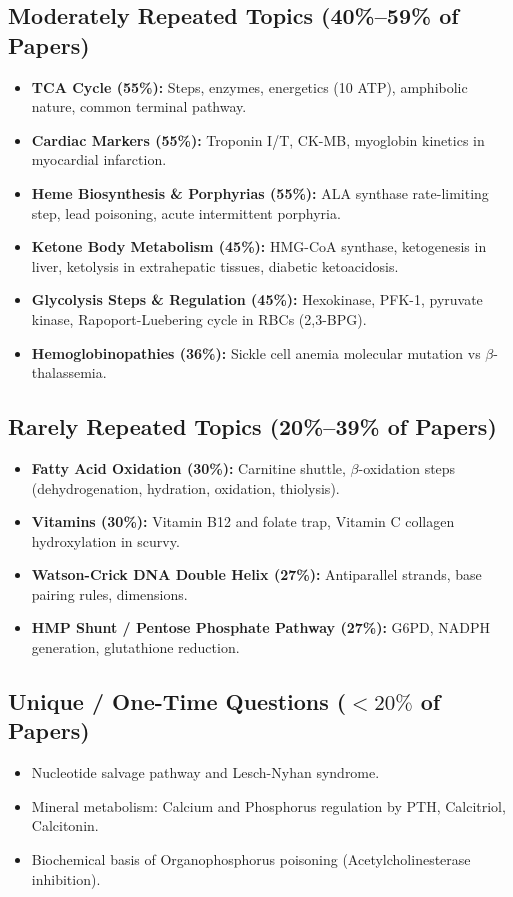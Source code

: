 \documentclass[11pt,a4paper]{article}
\begin{document}
\subsection{Moderately Repeated Topics (40\%--59\% of Papers)}
\begin{itemize}[leftmargin=*]
    \item \textbf{TCA Cycle (55\%):} Steps, enzymes, energetics (10 ATP), amphibolic nature, common terminal pathway.
    \item \textbf{Cardiac Markers (55\%):} Troponin I/T, CK-MB, myoglobin kinetics in myocardial infarction.
    \item \textbf{Heme Biosynthesis \& Porphyrias (55\%):} ALA synthase rate-limiting step, lead poisoning, acute intermittent porphyria.
    \item \textbf{Ketone Body Metabolism (45\%):} HMG-CoA synthase, ketogenesis in liver, ketolysis in extrahepatic tissues, diabetic ketoacidosis.
    \item \textbf{Glycolysis Steps \& Regulation (45\%):} Hexokinase, PFK-1, pyruvate kinase, Rapoport-Luebering cycle in RBCs (2,3-BPG).
    \item \textbf{Hemoglobinopathies (36\%):} Sickle cell anemia molecular mutation vs $\beta$-thalassemia.
\end{itemize}

\subsection{Rarely Repeated Topics (20\%--39\% of Papers)}
\begin{itemize}[leftmargin=*]
    \item \textbf{Fatty Acid Oxidation (30\%):} Carnitine shuttle, $\beta$-oxidation steps (dehydrogenation, hydration, oxidation, thiolysis).
    \item \textbf{Vitamins (30\%):} Vitamin B12 and folate trap, Vitamin C collagen hydroxylation in scurvy.
    \item \textbf{Watson-Crick DNA Double Helix (27\%):} Antiparallel strands, base pairing rules, dimensions.
    \item \textbf{HMP Shunt / Pentose Phosphate Pathway (27\%):} G6PD, NADPH generation, glutathione reduction.
\end{itemize}

\subsection{Unique / One-Time Questions ($<20\%$ of Papers)}
\begin{itemize}[leftmargin=*]
    \item Nucleotide salvage pathway and Lesch-Nyhan syndrome.
    \item Mineral metabolism: Calcium and Phosphorus regulation by PTH, Calcitriol, Calcitonin.
    \item Biochemical basis of Organophosphorus poisoning (Acetylcholinesterase inhibition).
\end{itemize}
\end{document}
